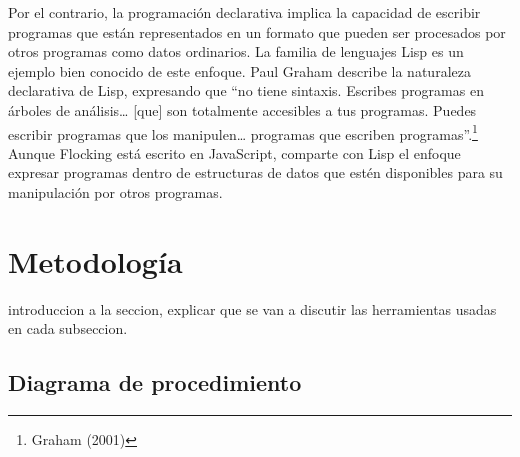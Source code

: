 \documentclass[]{article}
\begin{document}
Por el contrario, la programación declarativa implica la capacidad de
escribir programas que están representados en un formato que pueden ser
procesados por otros programas como datos ordinarios. La familia de
lenguajes Lisp es un ejemplo bien conocido de este enfoque. Paul Graham
describe la naturaleza declarativa de Lisp, expresando que ``no tiene
sintaxis. Escribes programas en árboles de análisis\ldots{} {[}que{]}
son totalmente accesibles a tus programas. Puedes escribir programas que
los manipulen\ldots{} programas que escriben programas''.\footnote{Graham
  (2001)} Aunque Flocking está escrito en JavaScript, comparte con Lisp
el enfoque expresar programas dentro de estructuras de datos que estén
disponibles para su manipulación por otros programas.

\newpage

\hypertarget{metodologuxeda}{%
\section{Metodología}\label{metodologuxeda}}

introduccion a la seccion, explicar que se van a discutir las
herramientas usadas en cada subseccion.

\hypertarget{diagrama-de-procedimiento}{%
\subsection{Diagrama de procedimiento}\label{diagrama-de-procedimiento}}
\end{document}
